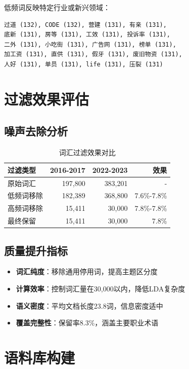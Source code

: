 \documentclass[11pt,a4paper]{article}
\begin{document}
低频词反映特定行业或新兴领域：

\begin{verbatim}
过道 (132), CODE (132), 营建 (131), 有亲 (131),
底新 (131), 房等 (131), 工效 (131), 投诉率 (131),
二外 (131), 小吃街 (131), 广告网 (131), 榜单 (131),
加工资 (131), 直供 (131), 假牙 (131), 废旧物资 (131),
人好 (131), 单员 (131), life (131), 压裂 (131)
\end{verbatim}

\section{过滤效果评估}

\subsection{噪声去除分析}

\begin{table}[h]
\centering
\begin{tabular}{lrrr}
\toprule
\textbf{过滤类型} & \textbf{2016-2017} & \textbf{2022-2023} & \textbf{效果} \\
\midrule
原始词汇 & 197,800 & 383,201 & - \\
低频词移除 & 182,389 & 368,800 & 7.6\%-7.8\% \\
高频词移除 & 15,411 & 30,000 & 7.8\%-7.8\% \\
\midrule
最终保留 & 15,411 & 30,000 & 7.8\% \\
\bottomrule
\end{tabular}
\caption{词汇过滤效果对比}
\end{table}

\subsection{质量提升指标}

\begin{itemize}
    \item \textbf{词汇纯度}：移除通用停用词，提高主题区分度
    \item \textbf{计算效率}：控制词汇量在30,000以内，降低LDA复杂度
    \item \textbf{语义密度}：平均文档长度23.8词，信息密度适中
    \item \textbf{覆盖完整性}：保留率8.3\%，涵盖主要职业术语
\end{itemize}

\section{语料库构建}
\end{document}
